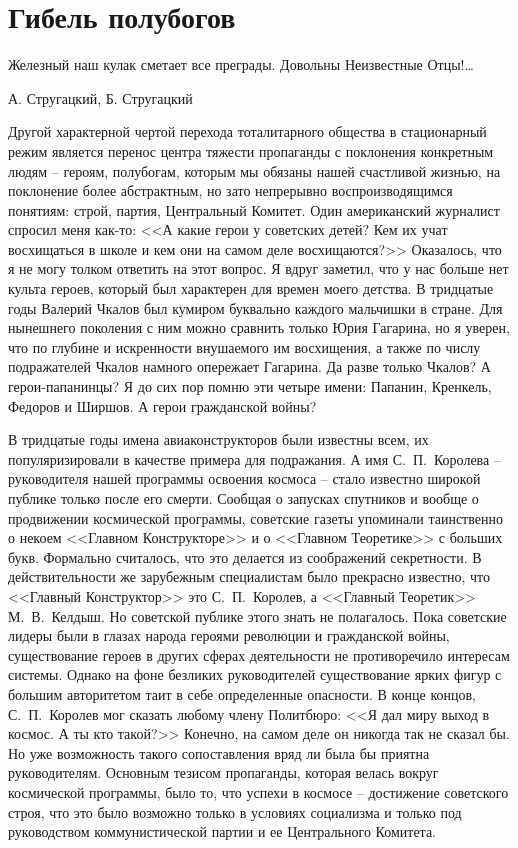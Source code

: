 \documentclass{book}
\begin{document}
\section{Гибель полубогов}
\epigraph{Железный наш кулак сметает все преграды. Довольны Неизвестные Отцы!\ldots}{А. Стругацкий, Б. Стругацкий%
	}

Другой характерной чертой перехода тоталитарного общества в стационарный режим является перенос центра тяжести пропаганды с поклонения конкретным людям -- героям, полубогам, которым мы обязаны нашей счастливой жизнью, на поклонение более абстрактным, но зато непрерывно воспроизводящимся понятиям: строй, партия, Центральный Комитет. Один американский журналист спросил меня как-то: <<А какие герои у советских детей? Кем их учат восхищаться в школе и кем они на самом деле восхищаются?>> Оказалось, что я не могу толком ответить на этот вопрос. Я вдруг заметил, что у нас больше нет культа героев, который был характерен для времен моего детства. В тридцатые годы Валерий Чкалов был кумиром буквально каждого мальчишки в стране. Для нынешнего поколения с ним можно сравнить только Юрия Гагарина, но я уверен, что по глубине и искренности внушаемого им восхищения, а также по числу подражателей Чкалов намного опережает Гагарина. Да разве только Чкалов? А герои-папанинцы? Я до сих пор помню эти четыре имени: Папанин, 
Кренкель, Федоров и Ширшов. А герои гражданской войны?

В тридцатые годы имена авиаконструкторов были известны всем, их популяризировали в качестве примера для подражания. А имя С.~П.~Королева -- руководителя нашей программы освоения космоса -- стало известно широкой публике только после его смерти. Сообщая о запусках спутников и вообще о продвижении космической программы, советские газеты упоминали таинственно о некоем <<Главном Конструкторе>> и о <<Главном Теоретике>> с больших букв. Формаль­но считалось, что это делается из соображений секретности. В действительности же зарубежным специалистам было прекрасно известно, что <<Главный Конструктор>> это С.~П.~Королев, а <<Главный Теоретик>> М.~В.~Келдыш. Но советской публике этого знать не полагалось. Пока советские лидеры были в глазах народа героями революции и гражданской войны, существование героев в других сферах деятельности не противоречило интересам системы. Однако на фоне безликих руководителей существование ярких фигур с большим автори­тетом таит в себе определенные опасности. В конце концов, С.~П.~Королев мог сказать любому члену Политбюро: <<Я дал миру выход в космос. А ты кто такой?>> Конечно, на самом деле он никогда так не сказал бы. Но уже возможность такого со­поставления вряд ли была бы приятна руководителям. Основным тезисом пропаганды, которая велась вокруг космической программы, было то, что успехи в космосе -- достижение советского строя, что это было возможно только в условиях социализма и только под руководством коммунистической партии и ее Центрального Комитета.
\end{document}
